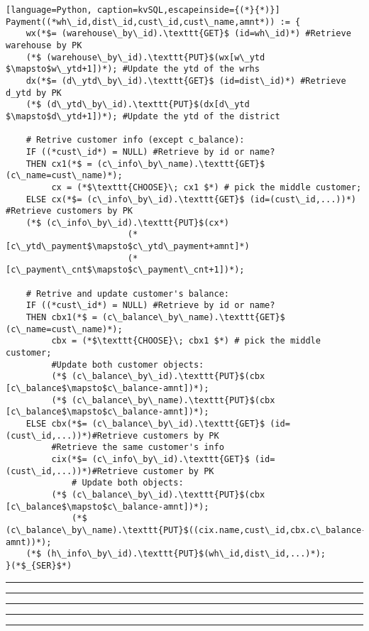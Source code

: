 \lstset{style=kvSQLstyle}
\begin{lstlisting}[language=Python, caption=kvSQL,escapeinside={(*}{*)}]
Payment((*wh\_id,dist\_id,cust\_id,cust\_name,amnt*)) := {
	wx(*$= (warehouse\_by\_id).\texttt{GET}$ (id=wh\_id)*) #Retrieve warehouse by PK
	(*$ (warehouse\_by\_id).\texttt{PUT}$(wx[w\_ytd $\mapsto$w\_ytd+1])*); #Update the ytd of the wrhs
	dx(*$= (d\_ytd\_by\_id).\texttt{GET}$ (id=dist\_id)*) #Retrieve d_ytd by PK
	(*$ (d\_ytd\_by\_id).\texttt{PUT}$(dx[d\_ytd $\mapsto$d\_ytd+1])*); #Update the ytd of the district
	
	# Retrive customer info (except c_balance):
	IF ((*cust\_id*) = NULL) #Retrieve by id or name?
	THEN cx1(*$ = (c\_info\_by\_name).\texttt{GET}$ (c\_name=cust\_name)*);
	     cx = (*$\texttt{CHOOSE}\; cx1 $*) # pick the middle customer;
	ELSE cx(*$= (c\_info\_by\_id).\texttt{GET}$ (id=(cust\_id,...))*) #Retrieve customers by PK
	(*$ (c\_info\_by\_id).\texttt{PUT}$(cx*)
						(*[c\_ytd\_payment$\mapsto$c\_ytd\_payment+amnt]*)
						(*[c\_payment\_cnt$\mapsto$c\_payment\_cnt+1])*);
	
	# Retrive and update customer's balance:
	IF ((*cust\_id*) = NULL) #Retrieve by id or name?
	THEN cbx1(*$ = (c\_balance\_by\_name).\texttt{GET}$ (c\_name=cust\_name)*);
	     cbx = (*$\texttt{CHOOSE}\; cbx1 $*) # pick the middle customer;
	     #Update both customer objects:
	     (*$ (c\_balance\_by\_id).\texttt{PUT}$(cbx [c\_balance$\mapsto$c\_balance-amnt])*);
	     (*$ (c\_balance\_by\_name).\texttt{PUT}$(cbx [c\_balance$\mapsto$c\_balance-amnt])*);
	ELSE cbx(*$= (c\_balance\_by\_id).\texttt{GET}$ (id=(cust\_id,...))*)#Retrieve customers by PK
	     #Retrieve the same customer's info
	     cix(*$= (c\_info\_by\_id).\texttt{GET}$ (id=(cust\_id,...))*)#Retrieve customer by PK
			 # Update both objects:
	     (*$ (c\_balance\_by\_id).\texttt{PUT}$(cbx [c\_balance$\mapsto$c\_balance-amnt])*);
			 (*$ (c\_balance\_by\_name).\texttt{PUT}$((cix.name,cust\_id,cbx.c\_balance-amnt))*);
	(*$ (h\_info\_by\_id).\texttt{PUT}$(wh\_id,dist\_id,...)*);		 
}(*$_{SER}$*)
\end{lstlisting}


\hrule
\hrule
\hrule
\hrule
\hrule



\vspace{5mm}
\lstset{style=simpSQLstyle}
